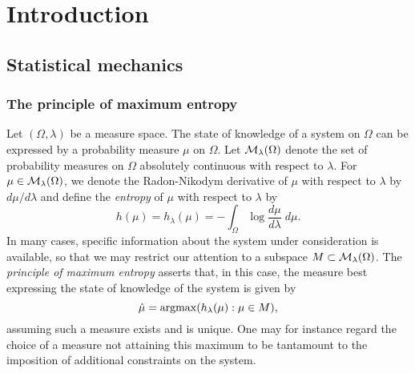 
\chapter{Introduction}


\section{Statistical mechanics}


\subsection{The principle of maximum entropy}

Let $(\Omega, \lambda)$ be a measure space. The state of knowledge of a system on $\Omega$ can be expressed by a probability measure $\mu$ on $\Omega$. Let
$\mathcal{M}_\lambda(\Omega)$ denote the set of probability measures on $\Omega$ absolutely continuous with respect to $\lambda$. For
$\mu \in \mathcal{M}_\lambda(\Omega)$, we denote the Radon-Nikodym derivative of
$\mu$ with respect to $\lambda$ by $d\mu/d\lambda$ and define the \emph{entropy} of $\mu$ with respect
to $\lambda$ by
\begin{equation}
h(\mu) = h_\lambda(\mu) = -\int_\Omega \log\frac{d\mu}{d\lambda} \; d\mu.
\end{equation}
In many cases, specific information about the system under consideration is available, so that we may restrict our attention to a subspace $M \subset \mathcal{M}_\lambda(\Omega)$.
The \emph{principle of maximum entropy} \cite{Jaynes57} asserts that, in this
case, the measure best expressing the state of knowledge of the system is given by
\begin{equation}
\hat\mu = \operatorname*{argmax}(h_\lambda(\mu) : \mu \in M),
\end{equation}
assuming such a measure exists and is unique. One may for instance regard the choice of a measure not attaining this maximum to be tantamount to the imposition of additional constraints on the system.

